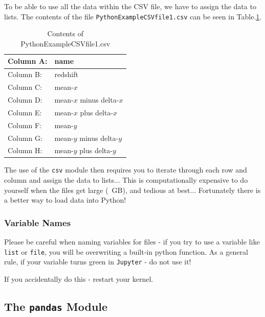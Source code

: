 To be able to use all the data within the CSV file, we have to assign the data to lists. The contents of the file \texttt{PythonExampleCSVfile1.csv} can be seen in Table.\ref{tab:s4csv}.

\begin{table}[H]
\begin{center}
\caption{Contents of PythonExampleCSVfile1.csv}
\begin{tabular}{|l|l|}
\hline
Column A:& name\\\hline
Column B:& redshift\\\hline
Column C:& mean-$x$\\\hline
Column D:& mean-$x$ minus delta-$x$\\\hline
Column E:& mean-$x$ plus delta-$x$\\\hline
Column F:& mean-$y$\\\hline
Column G:& mean-$y$ minus delta-$y$\\\hline
Column H:& mean-$y$ plus delta-$y$\\\hline
\end{tabular}
\label{tab:s4csv}
\end{center}
\end{table}\vspace*{-3ex}

The use of the \texttt{csv} module then requires you to iterate through each row and column and assign the data to lists... This is computationally expensive to do yourself when the files get large (~GB), and tedious at best... Fortunately there is a better way to load data into Python! 

\begin{tcolorbox}[colback=red!5!white,colframe=red!75!black]
\subsubsection{Variable Names}

Please be careful when naming variables for files - if you try to use a variable like \texttt{list} or \texttt{file}, you will be overwriting a built-in python function. As a general rule, if your variable turns green in \texttt{Jupyter} - do not use it!

If you accidentally do this - restart your kernel.
\end{tcolorbox}

\newpage

\subsection{The \texttt{pandas} Module}

